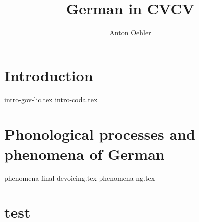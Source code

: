 \documentclass[
]{scrartcl}
\title{German in CVCV}
\author{Anton Oehler}
\begin{document}
\maketitle

\begin{abstract}

\end{abstract}

\section{Introduction}
{intro-gov-lic.tex}
{intro-coda.tex}

\section{Phonological processes and phenomena of German}
{phenomena-final-devoicing.tex}
{phenomena-ng.tex}

\section{test}
 
\begin{structure}
    \wordstart
    \V{\textschwa}
    \fen

\end{structure}

\begin{structure}
    \wordstart
    \emptyV
    \V[floating]{\textschwa}
    \fen

\end{structure}

\printbibliography
\end{document}
